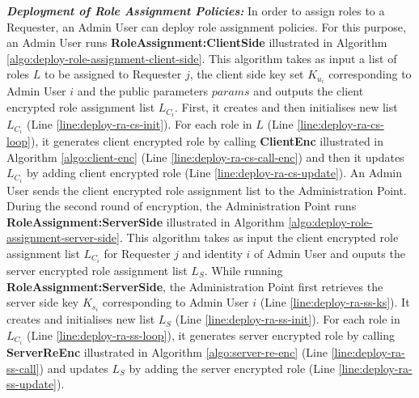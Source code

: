 \documentclass[final,5p,times,twocolumn]{elsarticle}
\begin{document}
\emph{\textbf{Deployment of Role Assignment Policies:}} 
In order to assign roles to a Requester, an Admin User can deploy role assignment policies. For this purpose, an Admin User runs \textbf{RoleAssignment:ClientSide} illustrated in Algorithm \ref{algo:deploy-role-assignment-client-side}. This algorithm takes as input a list of roles $L$ to be assigned to Requester $j$, the client side key set $K_{u_i}$ corresponding to Admin User $i$ and the public parameters $params$ and outputs the client encrypted role assignment list $L_{C_i}$. First, it creates and then initialises new list $L_{C_i}$ (Line \ref{line:deploy-ra-cs-init}). For each role in $L$ (Line \ref{line:deploy-ra-cs-loop}), it generates client encrypted role by calling \textbf{ClientEnc} illustrated in Algorithm \ref{algo:client-enc} (Line \ref{line:deploy-ra-cs-call-enc}) and then it updates $L_{C_i}$ by adding client encrypted role (Line \ref{line:deploy-ra-cs-update}). An Admin User sends the client encrypted role assignment list to the Administration Point. 
During the second round of encryption, the Administration Point runs \textbf{RoleAssignment:ServerSide} illustrated in Algorithm \ref{algo:deploy-role-assignment-server-side}. This algorithm takes as input the client encrypted role assignment list $L_{C_i}$ for Requester $j$ and identity $i$ of Admin User and ouputs the server encrypted role assignment list $L_{S}$. While running \textbf{RoleAssignment:ServerSide}, the Administration Point first retrieves the server side key $K_{s_i}$ corresponding to Admin User $i$ (Line \ref{line:deploy-ra-ss-ks}). It creates and initialises new list $L_{S}$ (Line \ref{line:deploy-ra-ss-init}). For each role in $L_{C_i}$ (Line \ref{line:deploy-ra-ss-loop}), it generates server encrypted role by calling \textbf{ServerReEnc} illustrated in Algorithm \ref{algo:server-re-enc} (Line \ref{line:deploy-ra-ss-call}) and updates $L_{S}$ by adding the server encrypted role (Line \ref{line:deploy-ra-ss-update}).
\end{document}
